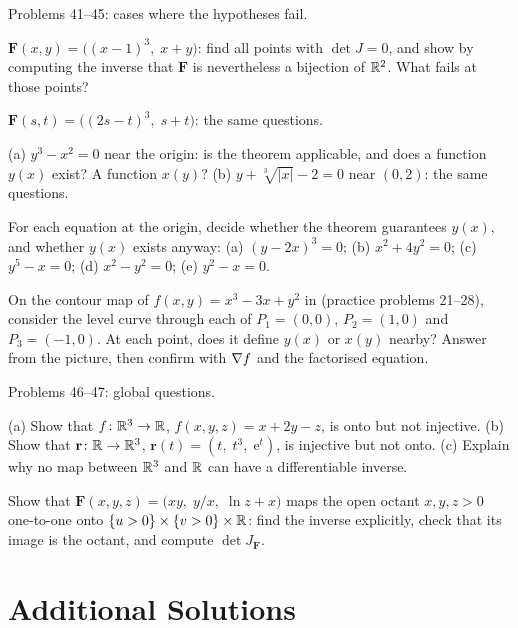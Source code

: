 Problems 41--45: cases where the hypotheses fail.

\begin{problems}[resume]
  \item $\mathbf{F}(x,y)=\bigl((x-1)^{3},\;x+y\bigr)$: find all points
        with $\det J=0$, and show by computing the inverse that $\mathbf{F}$
        is nevertheless a bijection of $\mathbb{R}^{2}$. What fails at those points?
  \item $\mathbf{F}(s,t)=\bigl((2s-t)^{3},\;s+t\bigr)$: the same
        questions.
  \item (a) $y^{3}-x^{2}=0$ near the origin: is the theorem applicable,
        and does a function $y(x)$ exist? A function $x(y)$? (b)
        $y+\sqrt[3]{|x|}-2=0$ near $(0,2)$: the same questions.
  \item For each equation at the origin, decide whether the theorem
        guarantees $y(x)$, and whether $y(x)$ exists anyway:
        (a) $(y-2x)^{3}=0$; (b) $x^{2}+4y^{2}=0$; (c) $y^{5}-x=0$;
        (d) $x^{2}-y^{2}=0$; (e) $y^{2}-x=0$.
  \item On the contour map of $f(x,y)=x^{3}-3x+y^{2}$ in 
        (practice problems 21--28), consider the level curve through each of
        $P_{1}=(0,0)$, $P_{2}=(1,0)$ and $P_{3}=(-1,0)$. At each point, does
        it define $y(x)$ or $x(y)$ nearby? Answer from the picture, then
        confirm with $\nabla f$ and the factorised equation.
\end{problems}

Problems 46--47: global questions.

\begin{problems}[resume]
  \item (a) Show that $f\colon\mathbb{R}^{3}\to\mathbb{R}$, $f(x,y,z)=x+2y-z$, is onto but
        not injective. (b) Show that $\mathbf{r}\colon\mathbb{R}\to\mathbb{R}^{3}$,
        $\mathbf{r}(t)=(t,\;t^{3},\;\mathrm{e}^{t})$, is injective but not
        onto. (c) Explain why no map between $\mathbb{R}^{3}$ and $\mathbb{R}$ can have a
        differentiable inverse.
  \item Show that $\mathbf{F}(x,y,z)=\bigl(xy,\;y/x,\;\ln z+x\bigr)$ maps
        the open octant $x,y,z>0$ one-to-one onto
        $\{u>0\}\times\{v>0\}\times\mathbb{R}$: find the inverse explicitly,
        check that its image is the octant, and compute $\det J_{\mathbf{F}}$.
\end{problems}

\section{Additional Solutions}

